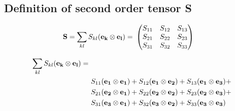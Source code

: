 \documentclass[11pt]{article}
\begin{document}
\subsection{Definition of second order tensor S}

\begin{align}
{\bf{S}} = \sum_{kl} S_{kl} ({\bf{e_k}} \otimes {\bf{e_l}}) = & \
\begin{pmatrix}
 S_{11} &  S_{12} &  S_{13}  \\
 S_{21} &  S_{22} &  S_{23} \\
 S_{31} &  S_{32} &  S_{33} 
\end{pmatrix}
\end{align}

\begin{align}
\sum_{kl} S_{kl} ({\bf{e_k}} \otimes {\bf{e_l}}) = & \\
&  \ S_{11} ({\bf{e_1}} \otimes {\bf{e_1}}) +  S_{12} ({\bf{e_1}} \otimes {\bf{e_2}}) +  S_{13} ({\bf{e_1}} \otimes {\bf{e_3}}) + \\
 & \  S_{21} ({\bf{e_2}} \otimes {\bf{e_1}}) +  S_{22} ({\bf{e_2}} \otimes {\bf{e_2}}) +  S_{23} ({\bf{e_2}} \otimes {\bf{e_3}}) + \\
 & \  S_{31} ({\bf{e_3}} \otimes {\bf{e_1}}) +  S_{32} ({\bf{e_3}} \otimes {\bf{e_2}}) +  S_{33} ({\bf{e_3}} \otimes {\bf{e_3}}) 
\end{align}
\end{document}
